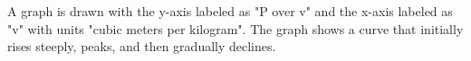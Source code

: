 A graph is drawn with the y-axis labeled as "P over v" and the x-axis labeled as "v" with units "cubic meters per kilogram". The graph shows a curve that initially rises steeply, peaks, and then gradually declines.